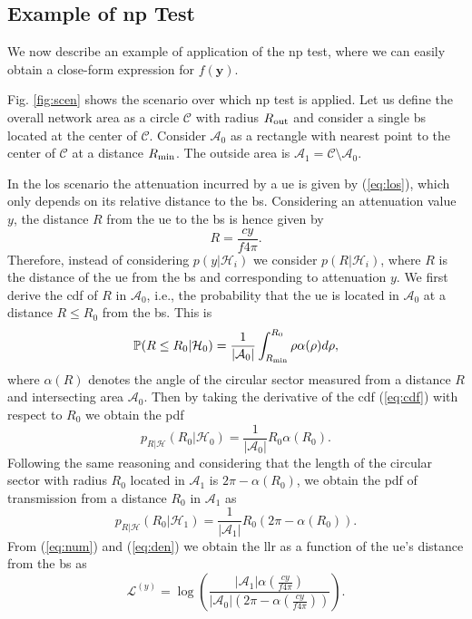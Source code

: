 \documentclass[conference,draftcls,onecolumn]{IEEEtran}
\begin{document}
\subsection{Example of \ac{np} Test}
\label{sec:los}
We now describe an example of application of the \ac{np} test, where we can easily obtain a close-form expression for $f(\bm{y})$. 

Fig. \ref{fig:scen} shows the scenario over which \ac{np} test is applied. Let us define the overall network area as a circle $\mathcal{C}$ with radius $R_{\rm out}$ and consider a single \ac{bs} located at the center of $\mathcal{C}$. Consider $\mathcal{A}_{0}$ as a rectangle with nearest point to the center of $\mathcal{C}$ at a distance $R_{\rm min}$. The outside area is $\mathcal{A}_1 = \mathcal{C} \setminus \mathcal{A}_0$.

In the \ac{los} scenario the attenuation incurred by a \ac{ue} is given by (\ref{eq:los}), which only depends on its relative distance to the \ac{bs}. Considering an attenuation value $y$, the distance $R$ from the \ac{ue} to the \ac{bs} is hence given by 
\begin{equation}
    R = \frac{c y}{f 4 \pi}.
\end{equation}
Therefore, instead of considering $p(y|\mathcal H_i)$ we consider $p(R|\mathcal H_i)$, where $R$ is the distance of the \ac{ue} from the \ac{bs} and corresponding to attenuation $y$. We first derive the \ac{cdf} of $R$ in $\mathcal{A}_0$, i.e.,  the probability that the \ac{ue} is located in $\mathcal{A}_0$ at a distance $R\le R_0$ from the \ac{bs}. This is
\begin{equation}\label{eq:cdf}
     \mathbb{P}(R \le R_0|\mathcal{H}_0) = \frac{1}{|\mathcal{A}_0|}\int_{R_{\rm min}}^{R_0} \rho \alpha(\rho) d\rho,
\end{equation}
where $\alpha(R)$ denotes the angle of the circular sector measured from a distance $R$ and intersecting area $\mathcal{A}_0$. Then by taking the derivative of the \ac{cdf} (\ref{eq:cdf}) with respect to $R_0$ we obtain the \ac{pdf} 
\begin{equation}\label{eq:num}
    p_{R|\mathcal{H}}(R_0|\mathcal{H}_0) = \frac{1}{|\mathcal{A}_0|}R_0\alpha(R_0).
\end{equation}
Following the same reasoning and considering that the length of the circular sector with radius $R_0$ located in $\mathcal{A}_1$ is $2\pi - \alpha(R_0)$, we obtain the \ac{pdf} of transmission from a distance $R_0$ in $\mathcal{A}_1$ as
\begin{equation}\label{eq:den}
     p_{R|\mathcal{H}}(R_0|\mathcal{H}_1) = \frac{1}{|\mathcal{A}_1|}R_0\left(2\pi-\alpha(R_0)\right).
\end{equation}
From (\ref{eq:num}) and (\ref{eq:den}) we obtain the \ac{llr} as a function of the \ac{ue}'s distance from the \ac{bs} as 
\begin{equation}
    \mathcal{L}^{(y)}=\log\left(\frac{|\mathcal{A}_1|\alpha(\frac{c y}{f 4 \pi})}{|\mathcal{A}_0|\left(2\pi-\alpha(\frac{c y}{f 4 \pi})\right)}\right).
\end{equation}
\end{document}
